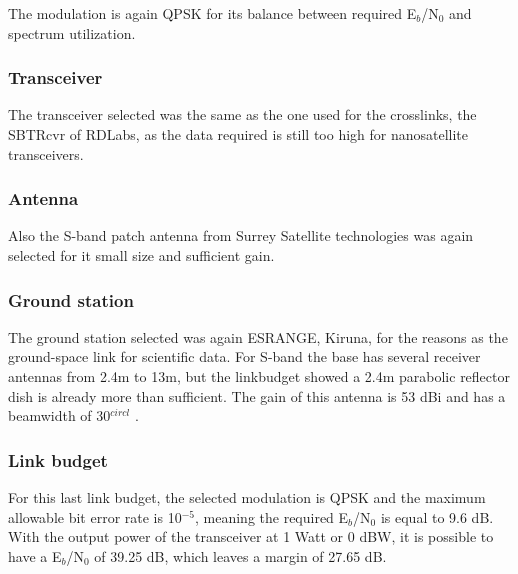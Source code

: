 The modulation is again QPSK for its balance between required E$_{b}$/N$_{0}$ and spectrum utilization.

\subsubsection{Transceiver}
The transceiver selected was the same as the one used for the crosslinks, the SBTRcvr of RDLabs, as the data required is still too high for nanosatellite transceivers.
\subsubsection{Antenna}
Also the S-band patch antenna from Surrey Satellite technologies was again selected for it small size and sufficient gain.
\subsubsection{Ground station}
The ground station selected was again ESRANGE, Kiruna, for the reasons as the ground-space link for scientific data. For S-band the base has several receiver antennas from 2.4m to 13m, but the linkbudget showed a 2.4m parabolic reflector dish is already more than sufficient. The gain of this antenna is 53 dBi and has a beamwidth of 30$^{circl}$ \cite{esrange}.

\subsubsection{Link budget}
For this last link budget, the selected modulation is QPSK and the maximum allowable bit error rate is 10$^{-5}$, meaning the required E$_{b}$/N$_{0}$ is equal to 9.6 dB. With the output power of the transceiver at 1 Watt or 0 dBW, it is possible to have a E$_{b}$/N$_{0}$ of 39.25 dB, which leaves a margin of 27.65 dB.
